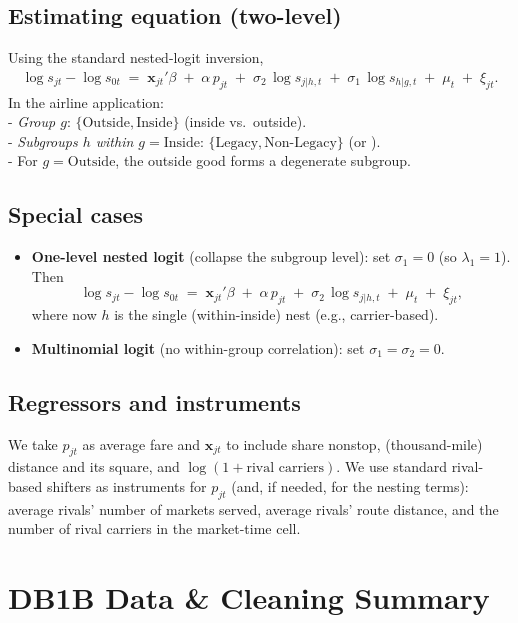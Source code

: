 \documentclass{article}
\begin{document}
\subsection*{Estimating equation (two-level)}
Using the standard nested-logit inversion,
\begin{align}
\boxed{~
\log s_{jt} - \log s_{0t}
\;=\;
\mathbf{x}_{jt}'\beta \;+\; \alpha\,p_{jt}
\;+\; \sigma_2\,\log s_{j|h,t}
\;+\; \sigma_1\,\log s_{h|g,t}
\;+\; \mu_t \;+\; \xi_{jt}.
~}
\label{eq:estim-2lvl}
\end{align}
In the airline application: \\
- \emph{Group $g$}: \(\{\text{Outside},\text{Inside}\}\) (inside vs.\ outside). \\
- \emph{Subgroups $h$ within $g=\text{Inside}$}: \(\{\text{Legacy}, \text{Non-Legacy}\}\) (or ). \\
- For $g=\text{Outside}$, the outside good forms a degenerate subgroup.

\subsection*{Special cases}
\begin{itemize}
\item \textbf{One-level nested logit} (collapse the subgroup level): set $\sigma_1=0$ (so $\lambda_1=1$). Then
\[
\log s_{jt} - \log s_{0t}
\;=\;
\mathbf{x}_{jt}'\beta \;+\; \alpha\,p_{jt}
\;+\; \sigma_2\,\log s_{j|h,t}
\;+\; \mu_t \;+\; \xi_{jt},
\]
where now $h$ is the single (within-inside) nest (e.g., carrier-based).
\item \textbf{Multinomial logit} (no within-group correlation): set $\sigma_1=\sigma_2=0$.
\end{itemize}

\subsection*{Regressors and instruments}
We take $p_{jt}$ as average fare and $\mathbf{x}_{jt}$ to include share nonstop, (thousand-mile) distance and its square, and $\log(1+\text{rival carriers})$. We use standard rival-based shifters as instruments for $p_{jt}$ (and, if needed, for the nesting terms): average rivals' number of markets served, average rivals' route distance, and the number of rival carriers in the market-time cell.

\section{DB1B Data \& Cleaning Summary}
\end{document}
